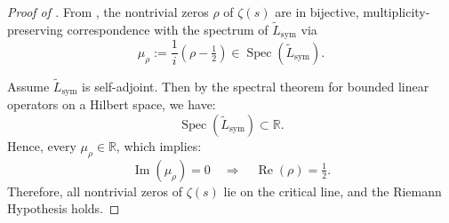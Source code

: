 \begin{proof}[Proof of ]
From , the nontrivial zeros $\rho$ of $\zeta(s)$ are in bijective, multiplicity-preserving correspondence with the spectrum of $\tilde{L}_{\mathrm{sym}}$ via
\[
\mu_\rho := \frac{1}{i}(\rho - \tfrac{1}{2}) \in \operatorname{Spec}(\tilde{L}_{\mathrm{sym}}).
\]

Assume $\tilde{L}_{\mathrm{sym}}$ is self-adjoint. Then by the spectral theorem for bounded linear operators on a Hilbert space, we have:
\[
\operatorname{Spec}(\tilde{L}_{\mathrm{sym}}) \subset \mathbb{R}.
\]
Hence, every $\mu_\rho \in \mathbb{R}$, which implies:
\[
\operatorname{Im}(\mu_\rho) = 0 \quad \Rightarrow \quad \operatorname{Re}(\rho) = \tfrac{1}{2}.
\]
Therefore, all nontrivial zeros of $\zeta(s)$ lie on the critical line, and the Riemann Hypothesis holds.
\end{proof}
